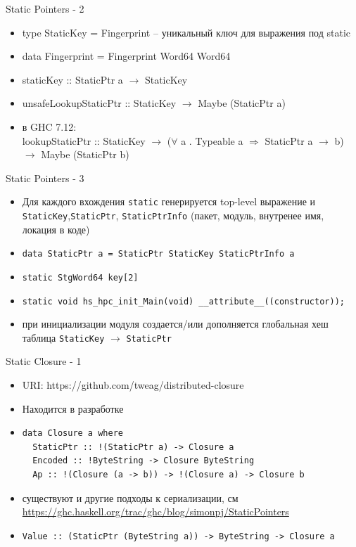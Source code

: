 \documentclass{beamer}
\begin{document}
\begin{frame}{Static Pointers - 2}
  \begin{itemize}
    \item type StaticKey = Fingerprint -- уникальный ключ для выражения под static
    \item data Fingerprint = Fingerprint Word64 Word64
    \item staticKey :: StaticPtr a $\rightarrow$ StaticKey
    \item unsafeLookupStaticPtr :: StaticKey $\rightarrow$ Maybe (StaticPtr a)
    \item в GHC 7.12: \\
      lookupStaticPtr :: StaticKey $\rightarrow$ ($\forall$ a . Typeable a $\Rightarrow$ StaticPtr a $\rightarrow$ b) $\rightarrow$ Maybe (StaticPtr b)
  \end{itemize}
\end{frame}

\begin{frame}{Static Pointers - 3}
  \begin{itemize}
    \item Для каждого вхождения \texttt{static} генерируется top-level выражение и
      \texttt{StaticKey},\texttt{StaticPtr}, \texttt{StaticPtrInfo} (пакет, модуль, внутренее имя, локация в коде)
    \item \texttt{data StaticPtr a = StaticPtr StaticKey StaticPtrInfo a}
    \item \texttt{static StgWord64 key[2]}
    \item \texttt{static void hs\_hpc\_init\_Main(void) \_\_attribute\_\_((constructor));}
    \item при инициализации модуля создается/или дополняется глобальная хеш таблица
      \texttt{StaticKey} $\rightarrow$ \texttt{StaticPtr}
  \end{itemize}
\end{frame}

\begin{frame}[fragile]{Static Closure - 1}
  \begin{itemize}
    \item URI: https://github.com/tweag/distributed-closure
    \item Находится в разработке
    \item 
\begin{verbatim}
data Closure a where
  StaticPtr :: !(StaticPtr a) -> Closure a
  Encoded :: !ByteString -> Closure ByteString
  Ap :: !(Closure (a -> b)) -> !(Closure a) -> Closure b
\end{verbatim}
    \item существуют и другие подходы к сериализации, см \\
    \url{https://ghc.haskell.org/trac/ghc/blog/simonpj/StaticPointers} \\
    \item
    \texttt{Value :: (StaticPtr (ByteString a)) -> ByteString -> Closure a}
  \end{itemize}
\end{frame}
\end{document}
